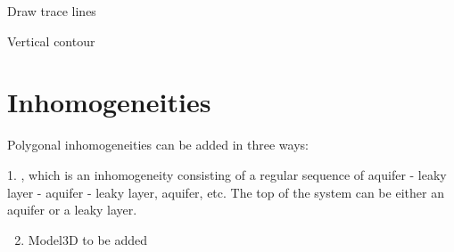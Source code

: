 \documentclass[letterpaper,10pt,english]{sphinxmanual}
\begin{document}
\begin{fulllineitems}
\begin{fulllineitems}
\begin{quote}
\begin{description}
\end{description}\end{quote}

\end{fulllineitems}


\begin{fulllineitems}
\label{\detokenize{models/model:timml.model.Model.tracelines}}
Draw trace lines

\end{fulllineitems}


\begin{fulllineitems}
\label{\detokenize{models/model:timml.model.Model.vcontour}}
Vertical contour

\end{fulllineitems}


\end{fulllineitems}



\section{Inhomogeneities}
\label{\detokenize{inhoms/inhoms:inhomogeneities}}\label{\detokenize{inhoms/inhoms::doc}}
Polygonal inhomogeneities can be added in three ways:

1. {\hyperref[\detokenize{inhoms/polygoninhommaq:timml.inhomogeneity.PolygonInhomMaq}]{}}, which is an inhomogeneity
consisting of a regular sequence of aquifer - leaky layer - aquifer - leaky layer, aquifer, etc.
The top of the system can be either an aquifer or a leaky layer.
\begin{enumerate}
\setcounter{enumi}{1}
\item {} 
Model3D to be added

\end{enumerate}
\end{document}
